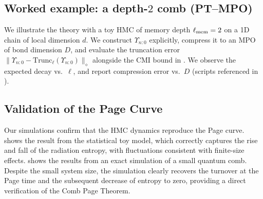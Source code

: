 \documentclass[11pt,a4paper]{article}
\newcommand{\HMC}{\textsc{HMC}\xspace}
\theoremstyle{plain}
\theoremstyle{definition}
\theoremstyle{remark}
\begin{document}
\subsection{Worked example: a depth-$2$ comb (PT--MPO)}

\label{sec:worked-example}
We illustrate the theory with a toy \HMC{} of memory depth $\ell_{\rm mem}=2$ on a 1D chain of local dimension $d$.
We construct $\Upsilon_{n{:}0}$ explicitly, compress it to an MPO of bond dimension $D$, and evaluate the truncation error
$\|\Upsilon_{n{:}0}-\mathrm{Trunc}_\ell(\Upsilon_{n{:}0})\|_\diamond$ alongside the CMI bound in .
We observe the expected decay vs.\ $\ell$, and report compression error vs.\ $D$ (scripts referenced in ).


\subsection{Validation of the Page Curve}
Our simulations confirm that the \HMC{} dynamics reproduce the Page curve.  shows the result from the statistical toy model, which correctly captures the rise and fall of the radiation entropy, with fluctuations consistent with finite-size effects.  shows the results from an exact simulation of a small quantum comb. Despite the small system size, the simulation clearly recovers the turnover at the Page time and the subsequent decrease of entropy to zero, providing a direct verification of the Comb Page Theorem.
\end{document}
